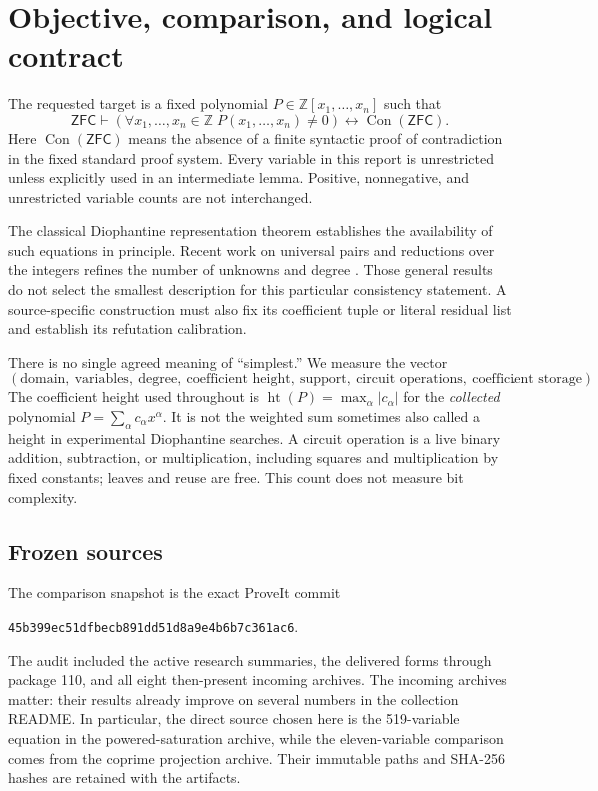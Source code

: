 \documentclass[11pt,a4paper]{article}
\theoremstyle{definition}
\theoremstyle{remark}
\newcommand{\ZFC}{\mathsf{ZFC}}
\newcommand{\Con}{\operatorname{Con}}
\newcommand{\file}[1]{\nolinkurl{#1}}
\newcommand{\Height}{\operatorname{ht}}
\begin{document}
\section{Objective, comparison, and logical contract}

The requested target is a fixed polynomial $P\in\mathbb Z[x_1,\ldots,x_n]$
such that
\begin{equation}
 \ZFC\vdash
 \left(\forall x_1,\ldots,x_n\in\mathbb Z\;P(x_1,\ldots,x_n)\ne0\right)
 \longleftrightarrow\Con(\ZFC).
 \label{eq:target}
\end{equation}
Here $\Con(\ZFC)$ means the absence of a finite syntactic proof of
contradiction in the fixed standard proof system. Every variable in this
report is unrestricted unless explicitly used in an intermediate lemma.
Positive, nonnegative, and unrestricted variable counts are not
interchanged.

The classical Diophantine representation theorem establishes the
availability of such equations in principle. Recent work on universal
pairs and reductions over the integers refines the number of unknowns
and degree \cite{bayer,sun}. Those general results do not select the
smallest description for this particular consistency statement. A
source-specific construction must also fix its coefficient tuple or
literal residual list and establish its refutation calibration.

There is no single agreed meaning of ``simplest.'' We measure the vector
\[
 (\text{domain},\ \text{variables},\ \text{degree},\ \text{coefficient height},
 \ \text{support},\ \text{circuit operations},\ \text{coefficient storage}).
\]
The coefficient height used throughout is
$\Height(P)=\max_\alpha|c_\alpha|$ for the \emph{collected} polynomial
$P=\sum_\alpha c_\alpha x^\alpha$. It is not the weighted sum sometimes
also called a height in experimental Diophantine searches. A circuit
operation is a live binary addition, subtraction, or multiplication,
including squares and multiplication by fixed constants; leaves and
reuse are free. This count does not measure bit complexity.

\subsection{Frozen sources}

The comparison snapshot is the exact ProveIt commit
\begin{center}
\small\file{45b399ec51dfbecb891dd51d8a9e4b6b7c361ac6}.
\end{center}
The audit included the active research summaries, the delivered forms
through package 110, and all eight then-present incoming archives.
The incoming archives matter: their results already improve on several
numbers in the collection README. In particular, the direct source
chosen here is the 519-variable equation in the powered-saturation
archive, while the eleven-variable comparison comes from the coprime
projection archive. Their immutable paths and SHA-256 hashes are
retained with the artifacts.
\end{document}
